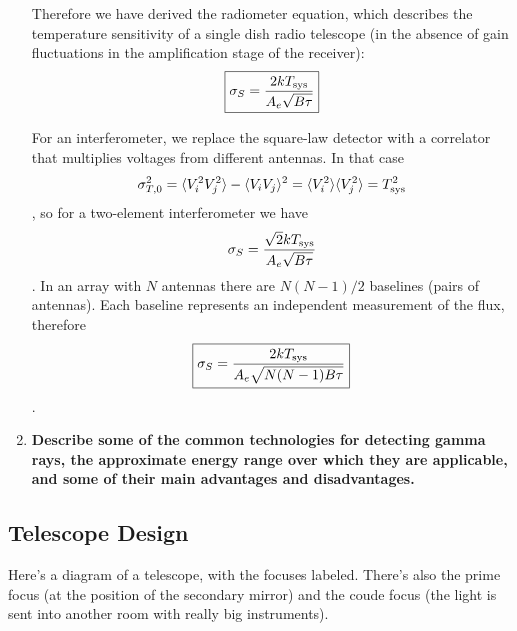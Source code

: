 \begin{enumerate}
      Therefore we have derived the radiometer equation, which describes the temperature
      sensitivity of a single dish radio telescope (in the absence of gain fluctuations in
      the amplification stage of the receiver):
      \begin{dmath}\boxed{
        \sigma_S = \frac{2kT_{\rm sys}}{A_e\sqrt{B\tau}}
      }\end{dmath}

      For an interferometer, we replace the square-law detector with a correlator that multiplies
      voltages from different antennas.  In that case
      \begin{dmath*}
        \sigma_{T,0}^2 = \langle V_i^2V_j^2\rangle - \langle V_iV_j\rangle^2
                       = \langle V_i^2\rangle\langle V_j^2\rangle \nolinebreak
                       = T_{\rm sys}^2
      \end{dmath*},
      so for a two-element interferometer we have
      \begin{dmath}
        \sigma_S = \frac{\sqrt{2}kT_{\rm sys}}{A_e\sqrt{B\tau}}
      \end{dmath}.
      In an array with $N$ antennas there are $N(N-1)/2$ baselines (pairs of antennas).
      Each baseline represents an independent measurement of the flux, therefore
      \begin{dmath}\boxed{
        \sigma_S = \frac{2kT_{\rm sys}}{A_e\sqrt{N(N-1)B\tau}}
      }\end{dmath}.

\item \textbf{Describe some of the common technologies for detecting gamma rays, the approximate
      energy range over which they are applicable, and some of their main advantages
      and disadvantages.}
\end{enumerate}


\subsection{Telescope Design}
Here's a diagram of a telescope, with the focuses labeled.  There's also the 
prime focus (at the position of the secondary mirror) and the coude focus 
(the light is sent into another room with really big instruments).  

